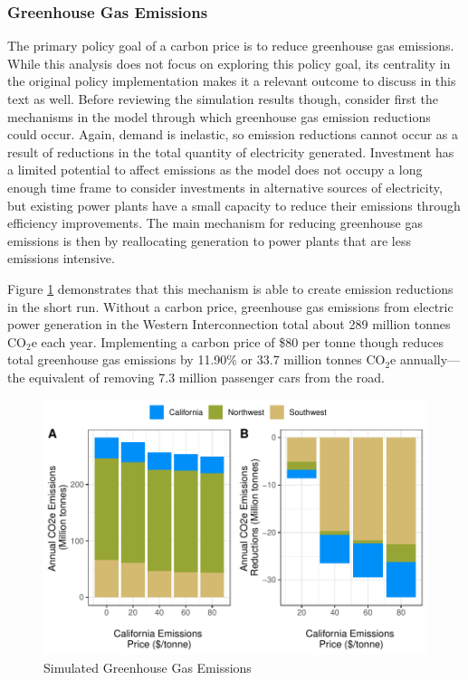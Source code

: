 \subsubsection*{Greenhouse Gas Emissions}

The primary policy goal of a carbon price is to reduce greenhouse gas emissions. While this analysis does not focus on exploring this policy goal, its centrality in the original policy implementation makes it a relevant outcome to discuss in this text as well. Before reviewing the simulation results though, consider first the mechanisms in the model through which greenhouse gas emission reductions could occur. Again, demand is inelastic, so emission reductions cannot occur as a result of reductions in the total quantity of electricity generated. Investment has a limited potential to affect emissions as the model does not occupy a long enough time frame to consider investments in alternative sources of electricity, but existing power plants have a small capacity to reduce their emissions through efficiency improvements. The main mechanism for reducing greenhouse gas emissions is then by reallocating generation to power plants that are less emissions intensive. 

Figure \ref{sim_co2e_bca} demonstrates that this mechanism is able to create emission reductions in the short run. Without a carbon price, greenhouse gas emissions from electric power generation in the Western Interconnection total about 289 million tonnes CO$_2$e each year. Implementing a carbon price of \$80 per tonne though reduces total greenhouse gas emissions by 11.90\% or 33.7 million tonnes CO$_2$e annually---the equivalent of removing 7.3 million passenger cars from the road. 

\begin{figure}
    \centering
    \caption{Simulated Greenhouse Gas Emissions\label{sim_co2e_bca}}
    \includegraphics[width=.9\textwidth]{figures/chapter5_figures/sim_co2e_bca.pdf}
\end{figure}

